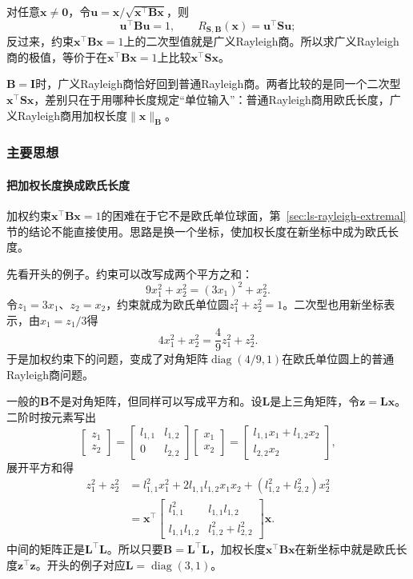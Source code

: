 对任意$\bm x\neq\bm0$，令$\bm u=\bm x/\sqrt{\bm x^\top\bm B\bm x}$，则
\[
 \bm u^\top\bm B\bm u=1,\qquad R_{\bm S,\bm B}(\bm x)=\bm u^\top\bm S\bm u ;
\]
反过来，约束$\bm x^\top\bm B\bm x=1$上的二次型值就是广义Rayleigh商。所以求广义Rayleigh商的极值，等价于在$\bm x^\top\bm B\bm x=1$上比较$\bm x^\top\bm S\bm x$。

$\bm B=\bm I$时，广义Rayleigh商恰好回到普通Rayleigh商。两者比较的是同一个二次型$\bm x^\top\bm S\bm x$，差别只在于用哪种长度规定“单位输入”：普通Rayleigh商用欧氏长度，广义Rayleigh商用加权长度$\lVert\bm x\rVert_{\bm B}$。

\subsubsection{主要思想}

\paragraph{把加权长度换成欧氏长度}
加权约束$\bm x^\top\bm B\bm x=1$的困难在于它不是欧氏单位球面，第~\ref{sec:ls-rayleigh-extremal}节的结论不能直接使用。思路是换一个坐标，使加权长度在新坐标中成为欧氏长度。

先看开头的例子。约束可以改写成两个平方之和：
\[
 9x_1^2+x_2^2=(3x_1)^2+x_2^2 .
\]
令$z_1=3x_1$、$z_2=x_2$，约束就成为欧氏单位圆$z_1^2+z_2^2=1$。二次型也用新坐标表示，由$x_1=z_1/3$得
\[
 4x_1^2+x_2^2=\frac49z_1^2+z_2^2 .
\]
于是加权约束下的问题，变成了对角矩阵$\operatorname{diag}(4/9,1)$在欧氏单位圆上的普通Rayleigh商问题。

一般的$\bm B$不是对角矩阵，但同样可以写成平方和。设$\bm L$是上三角矩阵，令$\bm z=\bm L\bm x$。二阶时按元素写出
\[
 \begin{bmatrix}z_1\\z_2\end{bmatrix}
 =\begin{bmatrix}l_{1,1}&l_{1,2}\\0&l_{2,2}\end{bmatrix}
 \begin{bmatrix}x_1\\x_2\end{bmatrix}
 =\begin{bmatrix}l_{1,1}x_1+l_{1,2}x_2\\l_{2,2}x_2\end{bmatrix},
\]
展开平方和得
\[
 \begin{aligned}
 z_1^2+z_2^2
 &=l_{1,1}^2x_1^2+2l_{1,1}l_{1,2}x_1x_2+(l_{1,2}^2+l_{2,2}^2)x_2^2\\
 &=\bm x^\top
 \begin{bmatrix}l_{1,1}^2&l_{1,1}l_{1,2}\\l_{1,1}l_{1,2}&l_{1,2}^2+l_{2,2}^2\end{bmatrix}
 \bm x .
 \end{aligned}
\]
中间的矩阵正是$\bm L^\top\bm L$。所以只要$\bm B=\bm L^\top\bm L$，加权长度$\bm x^\top\bm B\bm x$在新坐标中就是欧氏长度$\bm z^\top\bm z$。开头的例子对应$\bm L=\operatorname{diag}(3,1)$。

